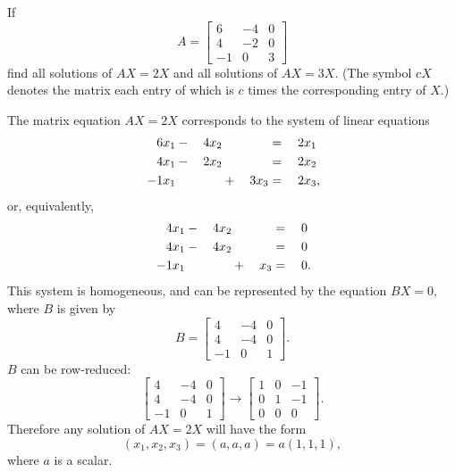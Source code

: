  If
\begin{equation*}
  A =
  \begin{bmatrix}
    6 & -4 & 0 \\
    4 & -2 & 0 \\
    -1 & 0 & 3
  \end{bmatrix}
\end{equation*}
find all solutions of $AX = 2X$ and all solutions of $AX = 3X$. (The
symbol $cX$ denotes the matrix each entry of which is $c$ times the
corresponding entry of $X$.)
\begin{solution}
  The matrix equation $AX = 2X$ corresponds to the system of linear
  equations
  \begin{alignat*}{4}
    6x_1 &{}-{}& 4x_2 && &{}={}& 2x_1 \\
    4x_1 &{}-{}& 2x_2 && &{}={}& 2x_2 \\
    -1x_1 && &{}+{}& 3x_3 &{}={}& 2x_3\rlap,
  \end{alignat*}
  or, equivalently,
  \begin{alignat*}{4}
    4x_1 &{}-{}& 4x_2 && &{}={}& 0 \\
    4x_1 &{}-{}& 4x_2 && &{}={}& 0 \\
    -1x_1 && &{}+{}& x_3 &{}={}& 0\rlap.
  \end{alignat*}
  This system is homogeneous, and can be represented by the equation
  $BX = 0$, where $B$ is given by
  \begin{equation*}
    B =
    \begin{bmatrix}
      4 & -4 & 0 \\
      4 & -4 & 0 \\
      -1 & 0 & 1
    \end{bmatrix}.
  \end{equation*}
  $B$ can be row-reduced:
  \begin{equation*}
    \begin{bmatrix}
      4 & -4 & 0 \\
      4 & -4 & 0 \\
      -1 & 0 & 1
    \end{bmatrix}
    \rightarrow
    \begin{bmatrix}
      1 & 0 & -1 \\
      0 & 1 & -1 \\
      0 & 0 & 0
    \end{bmatrix}.
  \end{equation*}
  Therefore any solution of $AX = 2X$ will have the form
  \begin{equation*}
    (x_1,x_2,x_3) = (a,a,a) = a(1,1,1),
  \end{equation*}
  where $a$ is a scalar.


\end{solution}
